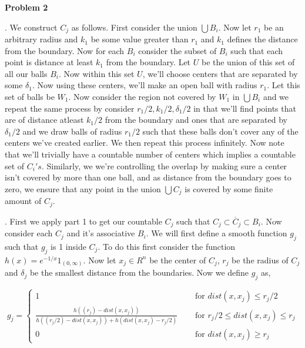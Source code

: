 \documentclass[a4paper]{article}
\begin{document}
\vspace{1em}

\textbf{Problem 2}

\vspace{1em}

. We construct $C_j$ as follows. First consider the union $\bigcup B_i$. Now let $r_{1}$ be an arbitrary radius and $k_{1}$ be some value greater than $r_{1}$ and $k_{1}$ defines the distance from the boundary. Now for each $B_i$ consider the subset of $B_i$ such that each point is distance at least $k_1$ from the boundary. Let $U$ be the union of this set of all our balls $B_i$. Now within this set $U$, we'll choose centers that are separated by some $\delta_{1}$. Now using these centers, we'll make an open ball with radius $r_{1}$. Let this set of balls be $W_{1}$. Now consider the region not covered by $W_{1}$ in $\bigcup B_i$ and we repeat the same process by consider $r_{1} /2, k_{1} / 2, \delta_{1} / 2$ in that we'll find points that are of distance atleast $k_{1} / 2$ from the boundary and ones that are separated by $\delta_{1}/2$ and we draw balls of radius $r_{1} / 2$ such that these balls don't cover any of the centers we've created earlier. We then repeat this process infinitely. Now note that we'll trivially have a countable number of centers which implies a countable set of $C_i's$. Similarly, we we're controlling the overlap by making sure a center isn't covered by more than one ball, and as distance from the boundary goes to zero, we ensure that any point in the union $\bigcup C_j$ is covered by some finite amount of $C_j$.

\vspace{1em}

. First we apply part 1 to get our countable $C_j$ such that $C_j \subset \overline C_j \subset B_i$. Now consider each $C_j$ and it's associative $B_i$. We will first define a smooth function $g_j$ such that $g_j$ is 1 inside $C_j$. To do this first consider the function $h(x) = e^{-1 / x} 1_{(0, \infty)}$. Now let $x_j \in R^{n}$ be the center of $C_j$, $r_j$ be the radius of $C_j$ and $\delta_j$ be the smallest distance from the boundaries. Now we define $g_j$ as,

\[
  g_j = \begin{cases}
    1 \quad &\text{ for }dist(x, x_j) \le r_j / 2\\
    \frac{h((r_j) - dist(x, x_j))}{h((r_j / 2) - dist(x, x_j)) +h(dist(x, x_j) - r_j / 2)} \quad &\text{ for } r_j / 2 \le dist(x, x_j) \le r_j \\
    0 \quad &\text{ for } dist(x, x_j) \ge r_j
  \end{cases}
\]  
\end{document}
